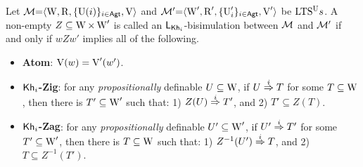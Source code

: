 \begin{definition}\label{def:bisim-khi}
Let $\mathcal{M}{=}\langle \operatorname{W},\operatorname{R},\{ \operatorname{U}(i) \}_{i\in{\rm \sf Agt}},\operatorname{V} \rangle$ and $\mathcal{M}'{=}\langle \operatorname{W}',\operatorname{R}',\{ \operatorname{U}'_i \}_{i\in{\rm \sf Agt}},\operatorname{V}' \rangle$ be ${\textup{LTS$^\text{\textup{U}}$}}s$.
%
A non-empty $Z \subseteq \operatorname{W} \times \operatorname{W}'$ is called an $\mathsf{L}_{{\sf Kh}_i}$-bisimulation between $\mathcal{M}$ and $\mathcal{M}'$ if and only if $wZw'$ implies all of the following.
\begin{itemize} 
    \item \textbf{Atom}: $\operatorname{V}(w)=\operatorname{V}'(w')$.

    \item \textbf{${\sf Kh}_i$-Zig}: for any \emph{propositionally} definable $U \subseteq \operatorname{W}$, if $U \stackrel{i}{\Rightarrow} T$ for some $T \subseteq \operatorname{W}$, then there is $T' \subseteq \operatorname{W}'$ such that: 
        1) $Z(U) \stackrel{i}{\Rightarrow} T'$, and
        2) $T' \subseteq Z(T)$.

    \item \textbf{${\sf Kh}_i$-Zag}: %
    for any \emph{propositionally} definable $U' \subseteq \operatorname{W}'$, if $U' \stackrel{i}{\Rightarrow} T'$ for some $T' \subseteq \operatorname{W}'$, then there is $T \subseteq \operatorname{W}$ such that: 
        1) $Z^{-1}(U') \stackrel{i}{\Rightarrow} T$, and
        2) $T \subseteq Z^{-1}(T')$.


\end{itemize}
\end{definition}
